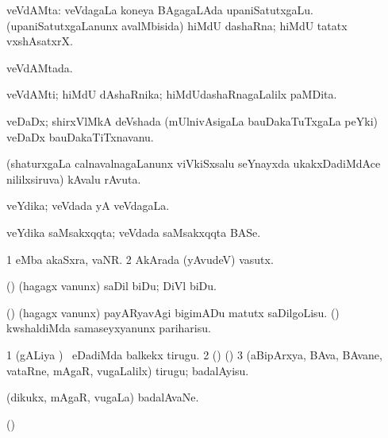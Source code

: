 \bentry
{} 
\gl{\nA}
\expl{}
\bmng
 veVdAMta: 
\banum
{} veVdagaLa koneya BAgagaLAda upaniSatutxgaLu. 
 (upaniSatutxgaLanunx avalMbisida) hiMdU dashaRna; hiMdU tatatx vxshAsatxrX. 
\eanum
\emng
\eentry

\bentry
{} 
\gl{\gu}
\expl{}
\bmng
 veVdAMtada. 
\emng
\eentry

\bentry
{} 
\gl{\nA}
\expl{}
\bmng
 veVdAMti; hiMdU dAshaRnika; hiMdUdashaRnagaLalilx paMDita. 
\emng
\eentry

\bentry
{} 
\gl{\nA}
\expl{}
\bmng
 veDaDx; shirxVlMkA deVshada (mUlnivAsigaLa bauDakaTuTxgaLa peYki) veDaDx bauDakaTiTxnavanu. 
\emng
\eentry

\bentry
{} 
\gl{\nA}
\expl{}
\bmng
 (shaturxgaLa calnavalnagaLanunx viVkiSxsalu seYnayxda ukakxDadiMdAce nililxsiruva) kAvalu rAvuta. 
\emng
\eentry

\bentry
{} 
\gl{\gu}
\expl{}
\bmng
 veYdika; veVdada yA veVdagaLa. 
\emng
\eentry

\bentry
{} 
\gl{\nA}
\expl{}
\bmng
 veYdika saMsakxqqta; veVdada saMsakxqqta BASe. 
\emng
\eentry

\bentry
{} 
\gl{\nA}
\expl{}
\bmng
\bnum
\num{1}  eMba akaSxra, vaNR. 
\num{2} AkArada (yAvudeV) vasutx. 
\enum
\emng
\eentry

\bentry
{} 
\gl{\sakirx}
\expl{}
\bmng
(\nw) (hagagx \mo vanunx) saDil biDu; DiVl biDu. 
\emng

\noindent
\gl{\pagu}
\expl{}
\bmng
\banum
{} (\nw) (hagagx \mo vanunx) payARyavAgi bigimADu matutx saDilgoLisu. 
 (\rUpa) kwshaldiMda samaseyxyanunx pariharisu. 
\eanum
\emng
\eentry

\bentry
{} 
\gl{\akirx}
\expl{}
\bmng
\bnum
\num{1} (gALiya \vi) \kanmu\ eDadiMda balkekx tirugu. 
\num{2} (\nw)  (\akirx) 
\num{3} (aBipArxya, BAva, BAvane, vataRne, mAgaR, \mo vugaLalilx) tirugu; badalAyisu. 
\enum
\emng
\eentry

\bentry
{} 
\gl{\nA}
\expl{}
\bmng
 (dikukx, mAgaR, \mo vugaLa) badalAvaNe. 
\emng
\eentry

\bentry
{} 
\gl{\nA}
\expl{}
\bmng
 (\AmA)  
\emng
\eentry


